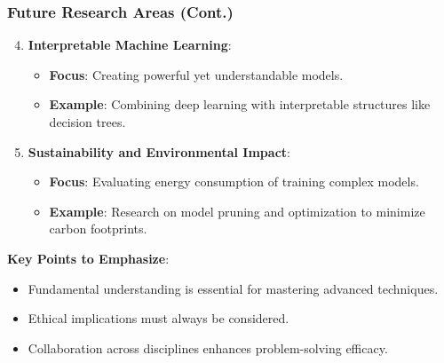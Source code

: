 \documentclass[aspectratio=169]{beamer}
\begin{document}
\begin{frame}[fragile]
    \frametitle{Future Research Areas (Cont.)}
    \begin{enumerate}
        \setcounter{enumi}{3}
        \item \textbf{Interpretable Machine Learning}:
            \begin{itemize}
                \item \textbf{Focus}: Creating powerful yet understandable models.
                \item \textbf{Example}: Combining deep learning with interpretable structures like decision trees.
            \end{itemize}
        
        \item \textbf{Sustainability and Environmental Impact}:
            \begin{itemize}
                \item \textbf{Focus}: Evaluating energy consumption of training complex models.
                \item \textbf{Example}: Research on model pruning and optimization to minimize carbon footprints.
            \end{itemize}
    \end{enumerate}
    
    \textbf{Key Points to Emphasize}:
    \begin{itemize}
        \item Fundamental understanding is essential for mastering advanced techniques.
        \item Ethical implications must always be considered.
        \item Collaboration across disciplines enhances problem-solving efficacy.
    \end{itemize}
\end{frame}
\end{document}
